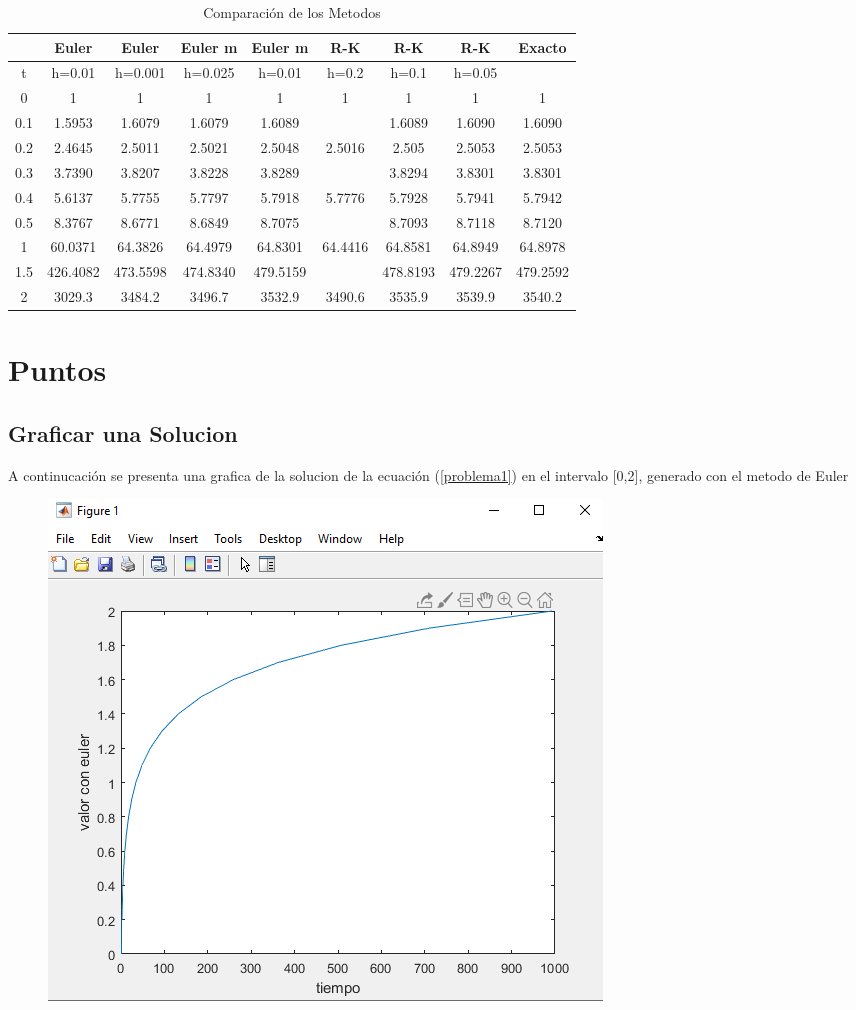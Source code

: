 \documentclass[12pt]{article}
\begin{document}
\begin{table}[h]
	\centering
	\begin{tabular}{|c|c|c|c|c|c|c|c|c|}
		\hline
		&Euler&Euler&Euler m&Euler m&R-K&R-K&R-K&Exacto\\
		\hline
		t & h=0.01 & h=0.001 & h=0.025 & h=0.01 & h=0.2 & h=0.1 & h=0.05 &\\
		\hline
		0&1&1&1&1&1&1&1&1\\
		\hline
		0.1&1.5953&1.6079&1.6079&1.6089&&1.6089&1.6090&1.6090\\
		\hline
		0.2&2.4645&2.5011&2.5021&2.5048&2.5016&2.505&2.5053&2.5053\\
		\hline
		0.3&3.7390&3.8207&3.8228&3.8289&&3.8294&3.8301&3.8301\\
		\hline
		0.4&5.6137&5.7755&5.7797&5.7918&5.7776&5.7928&5.7941&5.7942\\
		\hline
		0.5&8.3767&8.6771&8.6849&8.7075&&8.7093&8.7118&8.7120\\
		\hline
		1&60.0371&64.3826&64.4979&64.8301&64.4416&64.8581&64.8949&64.8978\\
		\hline
		1.5&426.4082&473.5598&474.8340&479.5159&&478.8193&479.2267&479.2592\\
		\hline
		2&3029.3&3484.2&3496.7&3532.9&3490.6&3535.9&3539.9&3540.2\\
		\hline
	\end{tabular}
	\caption{Comparación de los Metodos}
	\label{table1}
\end{table}
\newpage
\section{Puntos}
\subsection{Graficar una Solucion}
A continucación se presenta una grafica de la solucion de la ecuación  (\ref{problema1}) en el intervalo [0,2], generado con el metodo de Euler
\begin{figure}[h]
	\centering
	\caption{}
	\includegraphics[scale=0.3]{graf1.png}
	\label{graf1}
\end{figure}
\end{document}
